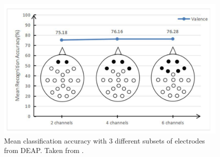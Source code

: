 \begin{figure}[h!]
\includegraphics[width=12cm]{img/related_work/wu_electrodes.png}
\centering
\caption{Mean classification accuracy with 3 different subsets of electrodes from DEAP. Taken from  \cite{wu_estimation_2017}.}\label{fig_wu_electrodes}
\end{figure}


